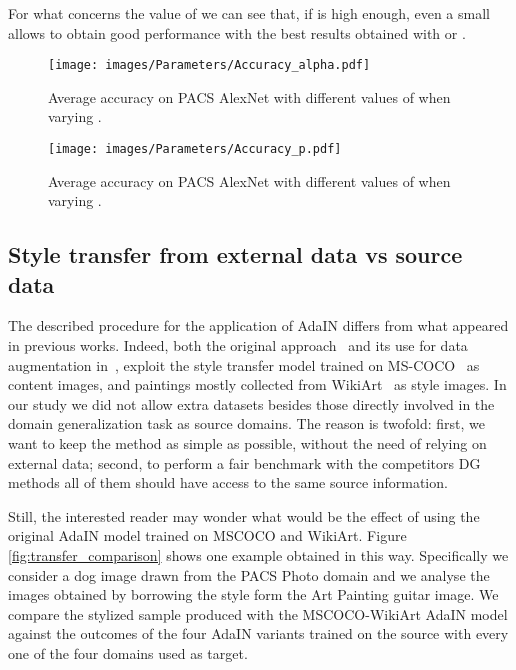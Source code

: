 For what concerns the value of  we can see that, if  is high enough, even a small  allows to obtain good performance with the best results obtained with  or .

\begin{figure}
    \centering
    \texttt{[image: images/Parameters/Accuracy\_alpha.pdf]}\vspace{-5mm}
    \caption{Average accuracy on PACS AlexNet with different values of  when varying .} 
    \label{fig:varying_alpha}\vspace{-5mm}
\end{figure}
\begin{figure}
    \centering
    \texttt{[image: images/Parameters/Accuracy\_p.pdf]}\vspace{-5mm}
    \caption{Average accuracy on PACS AlexNet with different values of  when varying .}
    \label{fig:varying_p} \vspace{-5mm}
\end{figure}


\subsection{Style transfer from external data vs source data} 
The described procedure for the application of AdaIN differs from what appeared in previous works. Indeed, both the original approach~\cite{Huang_2017_ICCV_adain} and its use for data augmentation in~\cite{zhang2020learning}, exploit the style transfer model trained on MS-COCO~\cite{mscoco} as content images, and paintings mostly collected from WikiArt~\cite{wikiart} as style images. In our study we did not allow extra datasets besides those directly involved in the domain generalization task as source domains. The reason is twofold: first, we want to keep the method as simple as possible, without the need of relying on external data; second, to perform a fair benchmark with the competitors DG methods all of them should have access to the same source information. 

Still, the interested reader may wonder what would be the effect of using the original AdaIN model trained on MSCOCO and WikiArt. Figure \ref{fig:transfer_comparison} shows one example obtained in this way. Specifically we consider a dog image drawn from the PACS Photo domain and we analyse the images obtained by borrowing the style form the Art Painting guitar image. 
We compare the stylized sample produced with the MSCOCO-WikiArt AdaIN model against the outcomes of the four AdaIN variants trained on the source with every one of the four domains used as target. 

